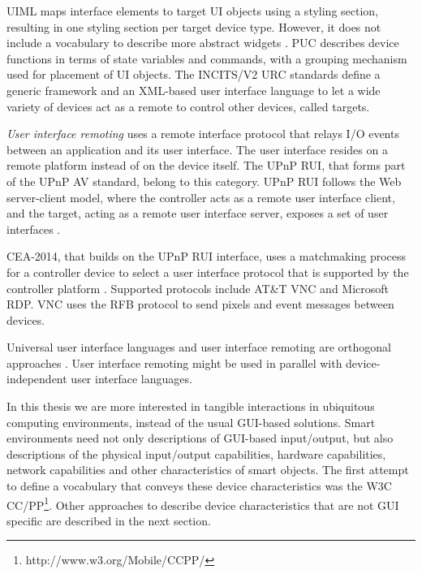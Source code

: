 \ac{UIML} maps interface elements to target UI objects using a styling section, resulting in one styling section per target device type. However, it does not include a vocabulary to describe more abstract widgets \cite{Zimmermann2007}. \ac{PUC} describes device functions in terms of state variables and commands, with a grouping mechanism used for placement of UI objects. The \ac{INCITS/V2 URC} standards define a generic framework and an XML-based user interface language to let a wide variety of devices act as a remote to control other devices, called targets.

\emph{User interface remoting} uses a remote interface protocol that relays I/O events between an application and its user interface. The user interface resides on a remote platform instead of on the device itself. The \ac{UPnP} \ac{RUI}, that forms part of the \ac{UPnP} AV standard,  belong to this category. \ac{UPnP} \ac{RUI} follows the Web server-client model, where the controller acts as a remote user interface client, and the target, acting as a remote user interface server, exposes a set of user interfaces \cite{UPnPForum}.

CEA-2014, that builds on the \ac{UPnP} \ac{RUI} interface, uses a matchmaking process for a controller device to select a user interface protocol that is supported by the controller platform \cite{Zimmermann2007}. Supported protocols include AT\&T \ac{VNC} and Microsoft \ac{RDP}. \ac{VNC} uses the \ac{RFB} protocol to send pixels and event messages between devices. 

Universal user interface languages and user interface remoting are orthogonal approaches \cite{Lee2006}. User interface remoting might be used in parallel with device-independent user interface languages.





In this thesis we are more interested in tangible interactions in ubiquitous computing environments, instead of the usual \ac{GUI}-based solutions. Smart environments need not only descriptions of \ac{GUI}-based input/output, but also descriptions of the physical input/output capabilities, hardware capabilities, network capabilities and other characteristics of smart objects. The first attempt to define a vocabulary that conveys these device characteristics was the W3C \ac{CC/PP}\footnote{http://www.w3.org/Mobile/CCPP/}. Other approaches to describe device characteristics that are not \ac{GUI} specific are described in the next section.

